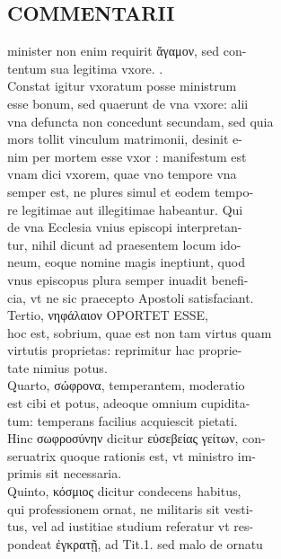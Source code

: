 \documentclass{article}
\begin{document}
\begin{pages}
\section*{COMMENTARII \\
                }minister non enim requirit ἄγαμον, sed con- \\
                tentum sua legitima vxore. . \\
                Constat igitur vxoratum posse ministrum \\
                esse bonum, sed quaerunt de vna vxore: alii \\
                vna defuncta non concedunt secundam, sed quia \\
                mors tollit vinculum matrimonii, desinit e- \\
                nim per mortem esse vxor : manifestum est \\
                vnam dici vxorem, quae vno tempore vna \\
                semper est, ne plures simul et eodem tempo- \\
                re legitimae aut illegitimae habeantur. Qui \\
                de vna Ecclesia vnius episcopi interpretan- \\
                tur, nihil dicunt ad praesentem locum ido- \\
                neum, eoque nomine magis ineptiunt, quod \\
                vnus episcopus plura semper inuadit benefi- \\
                cia, vt ne sic praecepto Apostoli satisfaciant. \\
                Tertio, νηφάλαιον OPORTET ESSE, \\
                hoc est, sobrium, quae est non tam virtus quam \\
                virtutis proprietas: reprimitur hac proprie- \\
                tate nimius potus. \\
                Quarto, σώφρονα, temperantem, moderatio \\
                est cibi et potus, adeoque omnium cupidita- \\
                tum: temperans facilius acquiescit pietati. \\
                Hinc σωφροσύνην dicitur εὐσεβείας γείτων, con- \\
                seruatrix quoque rationis est, vt ministro im- \\
                primis sit necessaria. \\
                Quinto, κόσμιος dicitur condecens habitus, \\
                qui professionem ornat, ne militaris sit vesti- \\
                tus, vel ad iustitiae studium referatur vt res- \\
                pondeat ἐγκρατῇ, ad Tit.1. sed malo de ornatu \\
                

\end{pages}
\end{document}

